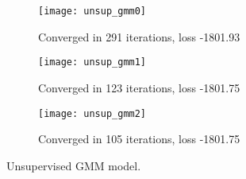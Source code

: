 \begin{answer}
		\begin{figure}[H]
		\centering
		\begin{subfigure}[H]{0.45\linewidth}
			\texttt{[image: unsup\_gmm0]}
			\caption{Converged in 291 iterations, loss -1801.93}
		\end{subfigure}
		\begin{subfigure}[H]{0.45\linewidth}
			\texttt{[image: unsup\_gmm1]}
			\caption{Converged in 123 iterations, loss -1801.75}
		\end{subfigure}
				\begin{subfigure}[H]{0.45\linewidth}
			\texttt{[image: unsup\_gmm2]}
			\caption{Converged in 105 iterations, loss -1801.75}
		\end{subfigure}
		\caption{Unsupervised GMM model.}
	\end{figure}
\end{answer}
